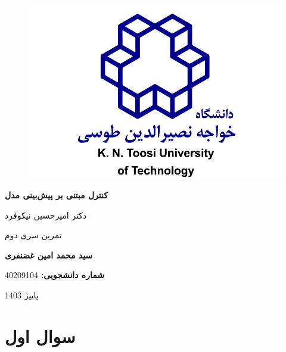 \documentclass[14pt, a4paper]{extarticle}
\begin{document}
\newpage
	\begin{titlepage}
	\centering
	\begin{figure}
		\centering
		\includegraphics[scale = 0.4]{kn-toosi.png}
	\end{figure}
	{\Huge \textbf{کنترل مبتنی بر پیش‌بینی مدل}}
	\par
	\vspace{0.5cm}
	
	{\large دکتر امیرحسین نیکوفرد}\par\vspace{1cm}
		\vspace{1cm}
	
	{\LARGE تمرین سری دوم}
	\par
	\vspace{3cm}
	
	{\LARGE \textbf{سید محمد امین غضنفری}}
	\par
	\vspace{1cm}
	
	\textbf{شماره دانشجویی:}
	{\large 40209104}
	\vspace{4cm}
	
	{\Large پاییز 1403}

	\end{titlepage}

\newpage

\tableofcontents

\newpage

\section{سوال اول}
\end{document}
